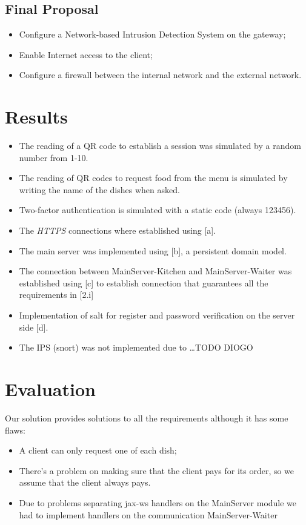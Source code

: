\documentclass[12pt,paper=a4]{article}
\begin{document}
\subsection{Final Proposal}
\begin{itemize}
\item[\ding{51}] Configure a Network-based Intrusion Detection System on the gateway;
\item[\ding{51}] Enable Internet access to the client;
\item[\ding{51}] Configure a firewall between the internal network and the external network.
\end{itemize}

\section{Results}
\begin{itemize}
\item The reading of a QR code to establish a session was simulated by a random number from 1-10.
\item The reading of QR codes to request food from the menu is simulated by writing the name of the dishes when asked.
\item Two-factor authentication is simulated with a static code (always 123456).
\item The \textit{HTTPS} connections where established using [a].
\item The main server was implemented using [b], a persistent domain model.
\item The connection between MainServer-Kitchen and MainServer-Waiter was established using [c] to establish connection that guarantees all the requirements in [2.i]
\item Implementation of salt for register and password verification on the server side [d].
\item The IPS (snort) was not implemented due to …TODO DIOGO
\end{itemize}
\section{Evaluation}
Our solution provides solutions to all the requirements although it has some flaws:
\begin{itemize}
\item A client can only request one of each dish;
\item There’s a problem on making sure that the client pays for its order, so we assume that the client always pays. 
\item Due to problems separating jax-ws handlers on the MainServer module we had to implement handlers on the communication MainServer-Waiter
\end{itemize}
\end{document}
